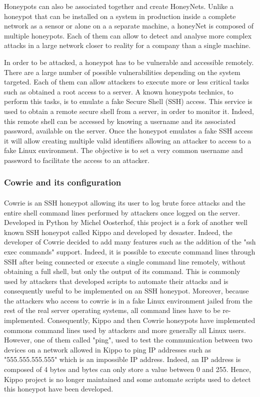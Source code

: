 Honeypots can also be associated together and create HoneyNets. Unlike a honeypot that can
be installed on a system in production inside a complete network as a sensor or alone on a
a separate machine, a honeyNet is composed of multiple honeypots. Each of them can allow to
detect and analyse more complex attacks in a large network closer to reality for a company
than a single machine.

In order to be attacked, a honeypot has to be vulnerable and accessible remotely. There are a
large number of possible vulnerabilities depending on the system targeted. Each of them can
allow attackers to execute more or less critical tasks such as obtained a root access to
a server. A known honeypots technics, to perform this tasks, is to emulate a fake Secure Shell
(SSH) access. This service is used to obtain a remote secure shell from a server, in order
to monitor it. Indeed, this remote shell can be accessed by knowing a username and its 
associated password, available on the server. Once the honeypot emulates a fake SSH access it
will allow creating multiple valid identifiers allowing an attacker to access to a fake 
Linux environment. The objective is to set a very common username and password to facilitate 
the access to an attacker.

\subsubsection{Cowrie and its configuration} %

\paragraph{} 

Cowrie is an SSH honeypot allowing its user to log brute force attacks and the entire shell 
command lines performed by attackers once logged on the server. Developed in Python by 
Michel Oosterhof, this project is a fork of another well known SSH honeypot called Kippo \cite{kippo} and
developed by desaster. Indeed, the developer of Cowrie decided to add many features such as
the addition of the "ssh exec commands" support. Indeed, it is possible to execute command 
lines through SSH after being connected or execute a single command line remotely, without 
obtaining a full shell, but only the output of its command. This is commonly used by attackers 
that developed scripts to automate their attacks and is consequently useful to be implemented
on an SSH honeypot.
Moreover, because the attackers who access to cowrie is in a fake Linux environment jailed from
the rest of the real server operating systems, all command lines have to be re-implemented. 
Consequently, Kippo and then Cowrie honeypots have implemented commons command lines used by
attackers and more generally all Linux users. However, one of them called "ping", used to 
test the communication between two devices on a network allowed in Kippo to ping IP addresses
such as "555.555.555.555" which is an impossible IP address. Indeed, an IP address is composed
of 4 bytes and bytes can only store a value between 0 and 255. Hence, Kippo project is no longer
 maintained and some automate scripts used to detect this honeypot have been developed.

